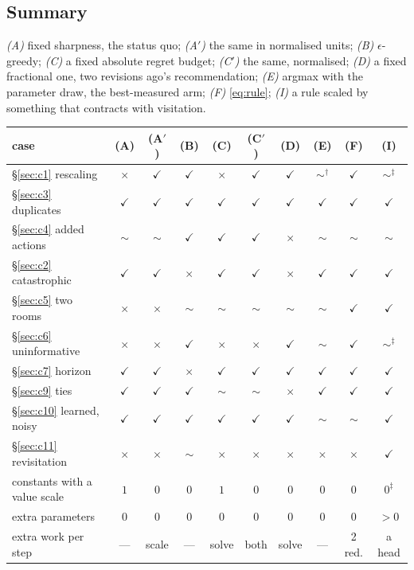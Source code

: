 \documentclass{article}
\newcommand{\yes}{\ensuremath{\checkmark}}
\newcommand{\no}{\ensuremath{\times}}
\newcommand{\meh}{\ensuremath{\sim}}
\begin{document}
\subsection{Summary}
\label{sec:summary}

\emph{(A)} fixed sharpness, the status quo; \emph{(A$'$)} the same in normalised units;
\emph{(B)} $\epsilon$-greedy; \emph{(C)} a fixed absolute regret budget; \emph{(C$'$)} the same,
normalised; \emph{(D)} a fixed fractional one, two revisions ago's recommendation; \emph{(E)}
argmax with the parameter draw, the best-measured arm; \emph{(F)} \eqref{eq:rule}; \emph{(I)} a
rule scaled by something that contracts with visitation.

\begin{center}
\small
\setlength{\tabcolsep}{4.5pt}
\begin{tabular}{lccccccccc}
  \toprule
  case & (A) & (A$'$) & (B) & (C) & (C$'$) & (D) & (E) & (F) & (I) \\
  \midrule
  \S\ref{sec:c1} rescaling        & \no  & \yes & \yes & \no  & \yes & \yes & \meh$^\dagger$ & \yes & \meh$^\ddagger$ \\
  \S\ref{sec:c3} duplicates       & \yes & \yes & \yes & \yes & \yes & \yes & \yes & \yes & \yes \\
  \S\ref{sec:c4} added actions    & \meh & \meh & \yes & \yes & \yes & \no  & \meh & \meh & \meh \\
  \S\ref{sec:c2} catastrophic     & \yes & \yes & \no  & \yes & \yes & \no  & \yes & \yes & \yes \\
  \S\ref{sec:c5} two rooms        & \no  & \no  & \meh & \meh & \meh & \meh & \meh & \yes & \yes \\
  \S\ref{sec:c6} uninformative    & \no  & \no  & \yes & \no  & \no  & \yes & \meh & \yes & \meh$^\ddagger$ \\
  \S\ref{sec:c7} horizon          & \yes & \yes & \no  & \yes & \yes & \yes & \yes & \yes & \yes \\
  \S\ref{sec:c9} ties             & \yes & \yes & \yes & \meh & \meh & \no  & \yes & \yes & \yes \\
  \S\ref{sec:c10} learned, noisy  & \yes & \yes & \yes & \yes & \yes & \yes & \meh & \meh & \yes \\
  \S\ref{sec:c11} revisitation    & \no  & \no  & \meh & \no  & \no  & \no  & \no  & \no  & \yes \\
  \midrule
  constants with a value scale    & $1$ & $0$ & $0$ & $1$ & $0$ & $0$ & $0$ & $0$ & $0^\ddagger$ \\
  extra parameters                & $0$ & $0$ & $0$ & $0$ & $0$ & $0$ & $0$ & $0$ & ${>}0$ \\
  extra work per step             & --- & scale & --- & solve & both & solve & --- & 2 red. & a head \\
  \bottomrule
\end{tabular}
\end{center}
\end{document}
